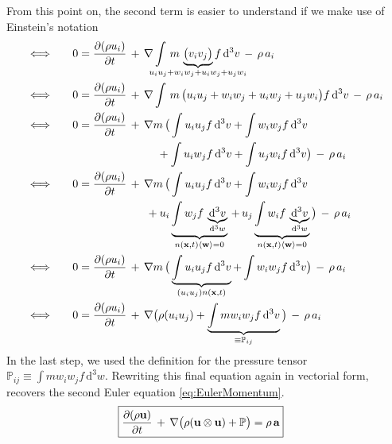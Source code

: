 \begin{itemize}
 From this point on, the second term is easier to understand if we make use of Einstein's notation
 \begin{align*}
 \Longleftrightarrow\qquad
  &0 = \frac{\partial(\rho u_{i})}{\partial t} \,+\, \nabla \int\,m \,\underbrace{ \big(v_{i}v_{j}\big) }_{\mathclap{u_{i}u_{j} + w_{i}w_{j} + u_{i}w_{j} + u_{j}w_{i}}} f\,\mathrm{d}^{3}v \,-\, \rho\,a_{i} \\
  \Longleftrightarrow\qquad
  &0 = \frac{\partial(\rho u_{i})}{\partial t} \,+\, \nabla \int\,m \,\big(u_{i}u_{j} + w_{i}w_{j} + u_{i}w_{j} + u_{j}w_{i}\big) f\,\mathrm{d}^{3}v \,-\, \rho\,a_{i} \\
  \Longleftrightarrow\qquad
  &0 = \frac{\partial(\rho u_{i})}{\partial t} \,+\, \nabla m \,\big( \int u_{i}u_{j} f\,\mathrm{d}^{3}v + \int w_{i}w_{j} f\,\mathrm{d}^{3}v \\
   &\hspace{76pt} + \int u_{i}w_{j} f\,\mathrm{d}^{3}v + \int u_{j}w_{i} f\,\mathrm{d}^{3}v\big) \,-\, \rho\,a_{i} \\
  \Longleftrightarrow\qquad
  &0 = \frac{\partial(\rho u_{i})}{\partial t} \,+\, \nabla m \,\big( \int u_{i}u_{j} f\,\mathrm{d}^{3}v + \int w_{i}w_{j} f\,\mathrm{d}^{3}v \\
   &\hspace{66pt} + u_{i} \underbrace{ \int w_{j} f\,\underbrace{ \mathrm{d}^{3}v }_{\mathrm{d}^{3}w} }_{n(\textbf{x}, t)\langle \textbf{w}\rangle = 0} \,+\, u_{j} \underbrace{ \int w_{i} f\,\underbrace{ \mathrm{d}^{3}v }_{\mathrm{d}^{3}w} }_{n(\textbf{x}, t)\langle \textbf{w}\rangle = 0}\big) \,-\, \rho\,a_{i} \\
  \Longleftrightarrow\qquad
  &0 = \frac{\partial(\rho u_{i})}{\partial t} \,+\, \nabla m \,\big( \underbrace{ \int u_{i}u_{j} f\,\mathrm{d}^{3}v }_{(u_{i}u_{j})n(\textbf{x}, t)} + \int w_{i}w_{j} f\,\mathrm{d}^{3}v\big) \,-\, \rho\,a_{i} \\
  \Longleftrightarrow\qquad
  &0 = \frac{\partial(\rho u_{i})}{\partial t} \,+\, \nabla \big( \rho(u_{i}u_{j}) + \underbrace{ \int m  w_{i}w_{j} f\,\mathrm{d}^{3}v}_{\equiv \mathbb{P}_{ij}} \big) \,-\, \rho\,a_{i}
 \end{align*}
 In the last step, we used the definition for the pressure tensor $\mathbb{P}_{ij} \equiv \int m  w_{i}w_{j} f\,\mathrm{d}^{3}w$.
 Rewriting this final equation again in vectorial form, recovers the second Euler equation \eqref{eq:EulerMomentum}.
 \begin{align*}
  \Aboxed{\frac{\partial(\rho \textbf{u})}{\partial t} \,+\, \nabla \big( \rho(\textbf{u}\otimes\textbf{u}) + \mathbb{P} \big) = \rho\,\textbf{a}}
 \end{align*}


\end{itemize}
